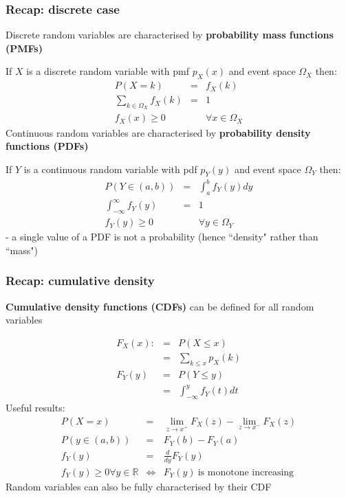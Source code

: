 \documentclass[t,8pt]{beamer}%
\begin{document}
\begin{frame}
\frametitle{Recap: discrete case}
Discrete random variables are characterised by {\bf probability mass functions (PMFs)} \par
If $X$ is a discrete random variable with pmf $p_X(x)$ and event space $\Omega_X$ then:
\begin{eqnarray*}
   P(X=k)&=&f_X(k)\\
   \sum_{k\in\Omega_X}f_X(k)&=&1\\
   f_X(x)\geq 0 && \forall x\in\Omega_X
\end{eqnarray*}
Continuous random variables are characterised by {\bf probability density functions (PDFs)} \par
If $Y$ is a continuous random variable with pdf $p_Y(y)$ and event space $\Omega_Y$ then:
\begin{eqnarray*}
   P(Y\in(a,b))&=&\int_a^bf_Y(y)dy\\
   \int_{-\infty}^{\infty}f_Y(y)&=&1\\
   f_Y(y)\geq 0 && \forall y\in\Omega_Y
\end{eqnarray*}
- a single value of a PDF is not a probability (hence ``density" rather than ``mass")
\end{frame}

\begin{frame}
\frametitle{Recap: cumulative density}
{\bf Cumulative density functions (CDFs)} can be defined for all random variables \par
\begin{eqnarray*}
   F_X(x):&=&P(X\leq x)\\
   &=&\sum_{k\leq x}p_X(k)\\
   F_Y(y)&=&P(Y\leq y)\\
   &=&\int_{-\infty}^yf_Y(t)dt
\end{eqnarray*}
Useful results:
\begin{eqnarray*}
P(X=x)&=&\lim_{z\rightarrow x^+}F_X(z)-\lim_{z\rightarrow x^-}F_X(z)\\
P(y\in(a,b))&=&F_Y(b)-F_Y(a)\\
f_Y(y)&=&\frac d{dy}F_Y(y)\\
f_Y(y)\geq 0\forall y\in\mathbb R &\Leftrightarrow & F_Y(y)\ \text{is monotone increasing}
\end{eqnarray*}
Random variables can also be fully characterised by their CDF
\end{frame}
\end{document}
